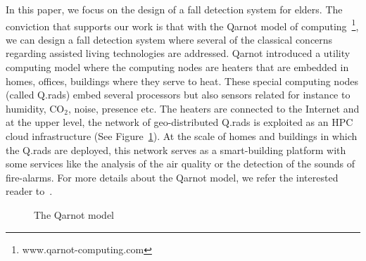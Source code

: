 \documentclass[10pt, conference, compsocconf]{IEEEtran}
\begin{document}
In this paper, we focus on the design of a fall detection system for elders. The conviction that supports our work is 
that with the Qarnot model of computing~\footnote{www.qarnot-computing.com}, we can design a fall detection system 
where several of the  classical concerns regarding assisted living technologies are addressed. Qarnot introduced 
a utility computing model where the computing nodes are heaters that are embedded in homes, offices, buildings where they serve 
to heat. These special computing nodes (called Q.rads) embed several processors but also sensors related for instance to 
humidity, $\mathrm{CO_2}$, noise, presence etc. The heaters are connected to the Internet and at the upper level, the network 
of geo-distributed Q.rads is exploited as an HPC cloud infrastructure (See Figure~\ref{fig:digital}). At the scale of homes 
and buildings in which the Q.rads are deployed, this network serves as a smart-building platform with some services like 
the analysis of the air quality or the detection of the sounds of fire-alarms. For more details about the Qarnot model, 
we refer the interested reader to~\cite{DBLP:conf/europar/Ngoko16}.

	\begin{figure}[htbp]
	\caption{The Qarnot model}
	\label{fig:digital}
	\end{figure}
\end{document}

